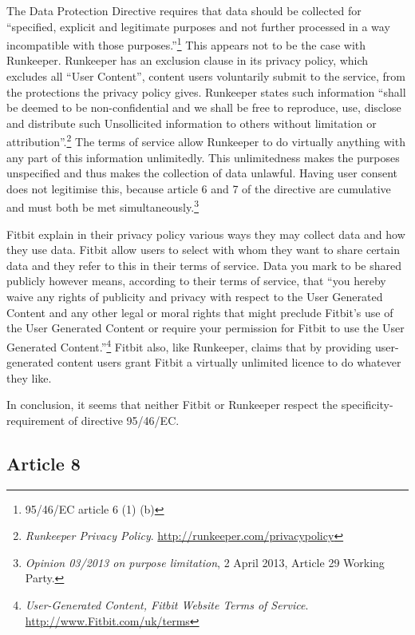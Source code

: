 \documentclass{article}
\begin{document}
The Data Protection Directive requires that data should be collected for ``specified, explicit and legitimate purposes and not further processed in a way incompatible with those purposes.''\footnote{95/46/EC article 6 (1) (b)}
This appears not to be the case with Runkeeper.
Runkeeper has an exclusion clause in its privacy policy, which excludes all ``User Content'', content users voluntarily submit to the service, from the protections the privacy policy gives.
Runkeeper states such information ``shall be deemed to be non-confidential and we shall be free to reproduce, use, disclose and distribute such Unsollicited information to others without limitation or attribution''.\footnote{\emph{Runkeeper Privacy Policy}. \url{http://runkeeper.com/privacypolicy}}
The terms of service allow Runkeeper to do virtually anything with any part of this information unlimitedly.
This unlimitedness makes the purposes unspecified and thus makes the collection of data unlawful. Having user consent does not legitimise this, because article 6 and 7 of the directive are cumulative and must both be met simultaneously.\footnote{\emph{Opinion 03/2013 on purpose limitation}, 2 April 2013, Article 29 Working Party.}

Fitbit explain in their privacy policy various ways they may collect data and how they use data.
Fitbit allow users to select with whom they want to share certain data and they refer to this in their terms of service.
Data you mark to be shared publicly however means, according to their terms of service, that ``you hereby waive any rights of publicity and privacy with respect to the User Generated Content and any other legal or moral rights that might preclude Fitbit's use of the User Generated Content or require your permission for Fitbit to use the User Generated Content.''\footnote{\emph{User-Generated Content, Fitbit Website Terms of Service}. \url{http://www.Fitbit.com/uk/terms}}
Fitbit also, like Runkeeper, claims that by providing user-generated content users grant Fitbit a virtually unlimited licence to do whatever they like.

In conclusion, it seems that neither Fitbit or Runkeeper respect the specificity-requirement of directive 95/46/EC.

\subsection{Article 8}
\end{document}
